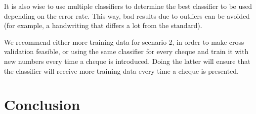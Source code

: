 \documentclass[11pt,twoside,a4paper]{article}
\begin{document}
It is also wise to use multiple classifiers to determine the best classifier to be used depending on the error rate. This way, bad results due to outliers can be avoided (for example, a handwriting that differs a lot from the standard).

We recommend either more training data for scenario 2, in order to make cross-validation feasible, or using the same classifier for every cheque and train it with new numbers every time a cheque is introduced. Doing the latter will ensure that the classifier will receive more training data every time a cheque is presented.

\section{Conclusion}

\newpage



\end{document}
